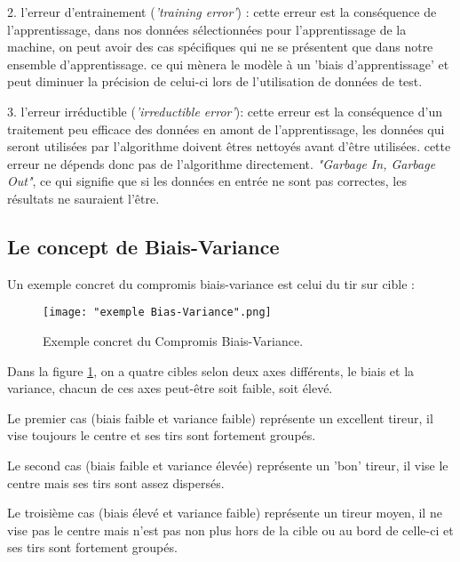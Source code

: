 \documentclass[a4paper]{article}
\begin{document}
2. l'erreur d'entrainement (\textit{'training error'}) : cette erreur est la conséquence de l'apprentissage, dans nos données sélectionnées pour l'apprentissage de la machine, on peut avoir des cas spécifiques qui ne se présentent que dans notre ensemble d'apprentissage. ce qui mènera le modèle à un 'biais d'apprentissage' et peut diminuer la précision de celui-ci lors de l'utilisation de données de test.\newline

3. l'erreur irréductible (\textit{'irreductible error'}): cette erreur est la conséquence d'un traitement peu efficace des données en amont de l'apprentissage, les données qui seront utilisées par l'algorithme doivent êtres nettoyés avant d'être utilisées. cette erreur ne dépends donc pas de l'algorithme directement.\newline
 \textit{"Garbage In, Garbage Out"}, ce qui signifie que si les données en entrée ne sont pas correctes, les résultats ne sauraient l'être. \newline

\newpage

\subsection{Le concept de Biais-Variance}
Un exemple concret du compromis biais-variance est celui du tir sur cible :

\begin{figure}[!h]
	\centering
	\texttt{[image: "exemple Bias-Variance".png]}
	\caption{Exemple concret du Compromis Biais-Variance. \cite{UnderstandingBiasVarianceTradeoff}}
	\label{ConcreteExample}
\end{figure}

Dans la figure \ref{ConcreteExample}, on a quatre cibles selon deux axes différents, le biais et la variance, chacun de ces axes peut-être soit faible, soit élevé. \par

Le premier cas (biais faible et variance faible) représente un excellent tireur, il vise toujours le centre et ses tirs sont fortement groupés. \par

Le second cas (biais faible et variance élevée) représente un 'bon' tireur, il vise le centre mais ses tirs sont assez dispersés. \par

Le troisième cas (biais élevé et variance faible) représente un tireur moyen, il ne vise pas le centre mais n'est pas non plus hors de la cible ou au bord de celle-ci et ses tirs sont fortement groupés. \par
\end{document}
